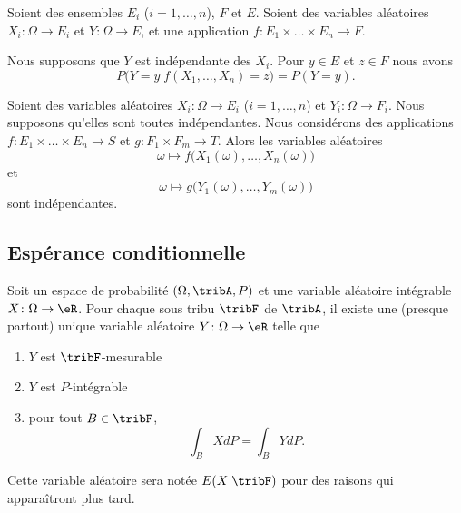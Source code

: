 \begin{lemma}            \label{LEMooZTBSooLemswG}
	Soient des ensembles \( E_i\) (\( i=1,\ldots, n\)), \( F\) et \( E\). Soient des variables aléatoires \( X_i\colon \Omega\to E_i\) et \( Y\colon \Omega\to E\), et une application \( f\colon E_1\times \ldots\times E_n\to F\).

	Nous supposons que \( Y\) est indépendante des \( X_i\). Pour \( y\in E\) et \( z\in F\) nous avons
	\begin{equation}
		P\big( Y=y|f(X_1,\ldots, X_n)=z \big)=P(Y=y).
	\end{equation}
\end{lemma}

\begin{lemma}        \label{LEMooWAOSooBsGucQ}
	Soient des variables aléatoires \( X_i\colon \Omega\to E_i\) (\( i=1,\ldots, n\)) et \( Y_i\colon \Omega\to F_i\). Nous supposons qu'elles sont toutes indépendantes. Nous considérons des applications \( f\colon E_1\times \ldots \times E_n\to S\) et \( g\colon F_1\times F_m\to T\). Alors les variables aléatoires
	\begin{equation}
		\omega\mapsto f\big( X_1(\omega),\ldots, X_n(\omega) \big)
	\end{equation}
	et
	\begin{equation}
		\omega\mapsto g\big( Y_1(\omega),\ldots, Y_m(\omega) \big)
	\end{equation}
	sont indépendantes.
\end{lemma}

\subsection{Espérance conditionnelle}

\begin{theoremDef}     \label{ThoMWfDPQ}
	Soit un espace de probabilité \( (\Omega,\tribA,P)\) et une variable aléatoire intégrable \( X\colon \Omega\to \eR\). Pour chaque sous tribu \( \tribF\) de \( \tribA\), il existe une (presque partout) unique variable aléatoire \( Y\colon \Omega\to \eR\) telle que
	\begin{enumerate}
		\item
		      \( Y\) est \( \tribF\)-mesurable
		\item
		      \( Y\) est \( P\)-intégrable
		\item
		      pour tout \( B\in\tribF\),
		      \begin{equation}        \label{EqBwBkgE}
			      \int_{B}XdP=\int_B YdP.
		      \end{equation}
	\end{enumerate}
	Cette variable aléatoire sera notée \( E(X|\tribF)\) pour des raisons qui apparaîtront plus tard.
\end{theoremDef}

